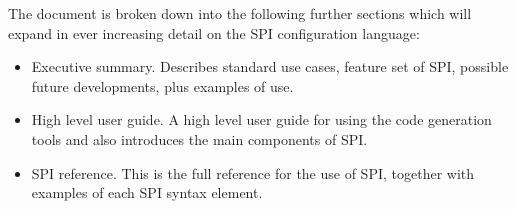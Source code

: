 \documentclass[a4paper] {article}
\begin{document}
The document is broken down into the following further sections which will expand in ever increasing detail on the SPI configuration language:
\begin{itemize}
  \item Executive summary. Describes standard use cases, feature set of SPI, possible future developments, plus examples of use.
  \item High level user guide. 
  A high level user guide for using the code generation tools and also introduces the main components of SPI.
  \item SPI reference. This is the full reference for the use of SPI, together with examples of each SPI syntax element.
\end{itemize}

\newpage


\newpage


\newpage


\newpage


\end{document}
